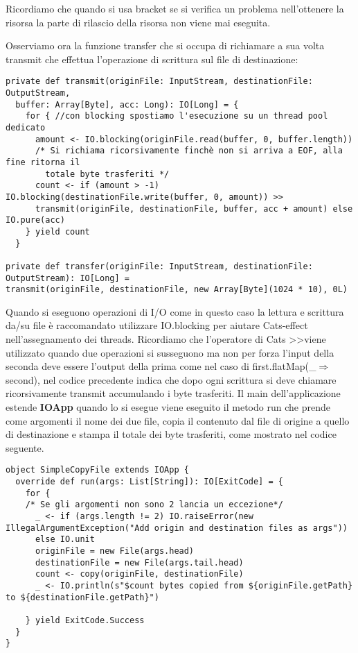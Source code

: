 \noindent Ricordiamo che quando si usa bracket se si verifica un problema nell’ottenere la risorsa la parte di rilascio della risorsa non viene mai eseguita.

Osserviamo ora la funzione transfer che si occupa di richiamare a sua volta transmit che effettua l’operazione di scrittura sul file di destinazione:

\begin{verbatim}
private def transmit(originFile: InputStream, destinationFile: OutputStream,
  buffer: Array[Byte], acc: Long): IO[Long] = {
    for { //con blocking spostiamo l'esecuzione su un thread pool dedicato
      amount <- IO.blocking(originFile.read(buffer, 0, buffer.length))
      /* Si richiama ricorsivamente finchè non si arriva a EOF, alla fine ritorna il
        totale byte trasferiti */
      count <- if (amount > -1) IO.blocking(destinationFile.write(buffer, 0, amount)) >>
      transmit(originFile, destinationFile, buffer, acc + amount) else IO.pure(acc)
    } yield count
  }
  
private def transfer(originFile: InputStream, destinationFile: OutputStream): IO[Long] =
transmit(originFile, destinationFile, new Array[Byte](1024 * 10), 0L)
\end{verbatim}

\noindent Quando si eseguono operazioni di I/O come in questo caso la lettura e scrittura da/su file è raccomandato utilizzare IO.blocking per aiutare Cats-effect nell’assegnamento dei threads. Ricordiamo che l’operatore di Cats \textgreater\textgreater viene utilizzato quando due operazioni si susseguono ma non per forza l’input della seconda deve essere l’output della prima come nel caso di first.flatMap(\_$\Rightarrow$second), nel codice precedente indica che dopo ogni scrittura si deve chiamare ricorsivamente transmit accumulando i byte trasferiti. Il main dell'applicazione estende \textbf{IOApp} quando lo si esegue viene eseguito il metodo run che prende come argomenti il nome dei due file, copia il contenuto dal file di origine a quello di
destinazione e stampa il totale dei byte trasferiti, come mostrato nel codice seguente.

\begin{verbatim}
object SimpleCopyFile extends IOApp {
  override def run(args: List[String]): IO[ExitCode] = {
    for {
    /* Se gli argomenti non sono 2 lancia un eccezione*/
      _ <- if (args.length != 2) IO.raiseError(new IllegalArgumentException("Add origin and destination files as args"))
      else IO.unit
      originFile = new File(args.head)
      destinationFile = new File(args.tail.head)
      count <- copy(originFile, destinationFile)
      _ <- IO.println(s"$count bytes copied from ${originFile.getPath} to ${destinationFile.getPath}")

    } yield ExitCode.Success
  }
}
\end{verbatim}

